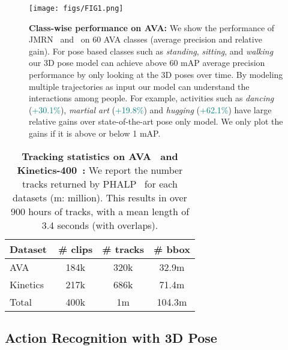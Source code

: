 \begin{figure*}[!ht]
    \centering
    \texttt{[image: figs/FIG1.png]}
    \caption{\textbf{Class-wise performance on AVA:} We show the performance of JMRN~\cite{shah2022pose} and \methodnameA \ on 60 AVA classes (average precision and relative gain). For pose based classes such as \textit{standing}, \textit{sitting}, and \textit{walking} our 3D pose model can achieve above 60 mAP average precision performance by only looking at the 3D poses over time. By modeling multiple trajectories as input our model can understand the interactions among people. For example, activities such as \textit{dancing} (\textcolor{teal}{+30.1\%}), \textit{martial art} (\textcolor{teal}{+19.8\%}) and \textit{hugging} (\textcolor{teal}{+62.1\%}) have large relative gains over state-of-the-art pose only model. We only plot the gains if it is above or below 1 mAP.}
    \label{fig:single_ve_multi_pose}
    \vspace{-0.4cm}
\end{figure*}


\begin{table}[!t]
\begin{center}
\small
\vspace{5pt}
\begin{tabular}{l c c c }
\toprule[0.4mm]
Dataset & \# clips & \# tracks & \# bbox \\ \midrule
AVA~\cite{gu2018ava} & 184k & 320k & 32.9m \\
Kinetics~\cite{kay2017kinetics} & 217k & 686k & 71.4m \\ \midrule
Total & 400k & 1m & 104.3m\\
\bottomrule[0.4mm]
\end{tabular}
\end{center}
\vspace{-10pt}
\caption{\textbf{Tracking statistics on AVA~\cite{gu2018ava} and Kinetics-400~\cite{kay2017kinetics}:} We report the number tracks returned by PHALP~\cite{rajasegaran2022tracking} for each datasets (m: million). This results in over 900 hours of tracks, with a mean length of 3.4 seconds (with overlaps). }
\label{tbl:phalp_tracks}
\end{table}


\subsection{Action Recognition with 3D Pose}
\label{sec:experiments_pose_only}

